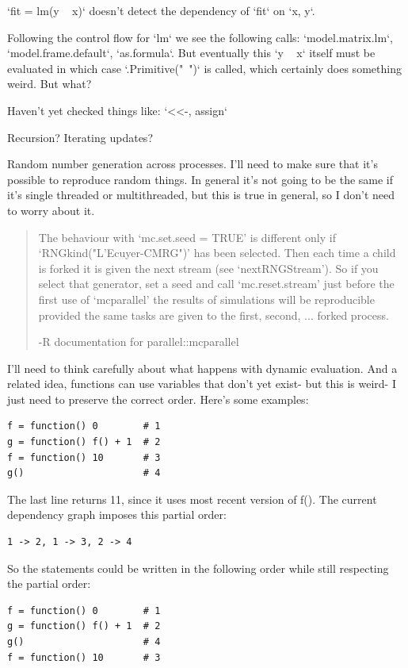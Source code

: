 \documentclass[12pt]{article}
\begin{document}
`fit = lm(y ~ x)` doesn't detect the dependency of `fit` on `x, y`.

Following the control flow for `lm` we see the following calls:
`model.matrix.lm`, `model.frame.default`, `as.formula`. But eventually this
`y ~ x` itself must be evaluated in which case `.Primitive("~")` is called,
which certainly does something weird. But what?

Haven't yet checked things like:
`<<-, assign`

Recursion? Iterating updates?

Random number generation across processes. I'll need to make sure that it's
possible to reproduce random things. In general it's not going to be the
same if it's single threaded or multithreaded, but this is true in general,
so I don't need to worry about it.

\begin{quote}
     The behaviour with ‘mc.set.seed = TRUE’ is different only if
     ‘RNGkind("L'Ecuyer-CMRG")’ has been selected.  Then each time a child
     is forked it is given the next stream (see ‘nextRNGStream’).  So if
     you select that generator, set a seed and call ‘mc.reset.stream’ just
     before the first use of ‘mcparallel’ the results of simulations will
     be reproducible provided the same tasks are given to the first,
     second, ...  forked process.

     -R documentation for parallel::mcparallel
\end{quote}

I'll need to think carefully about what happens with dynamic evaluation.
And a related idea, functions can use variables that don't yet exist- but this
is weird- I just need to preserve the correct order. Here's some examples:

\begin{verbatim}
f = function() 0        # 1
g = function() f() + 1  # 2
f = function() 10       # 3
g()                     # 4
\end{verbatim}

The last line returns 11, since it uses most recent version of f().
The current dependency graph imposes this partial order:

\begin{verbatim}
1 -> 2, 1 -> 3, 2 -> 4
\end{verbatim}

So the statements could be written in the following order while still respecting the
partial order:

\begin{verbatim}
f = function() 0        # 1
g = function() f() + 1  # 2
g()                     # 4
f = function() 10       # 3
\end{verbatim}
\end{document}
